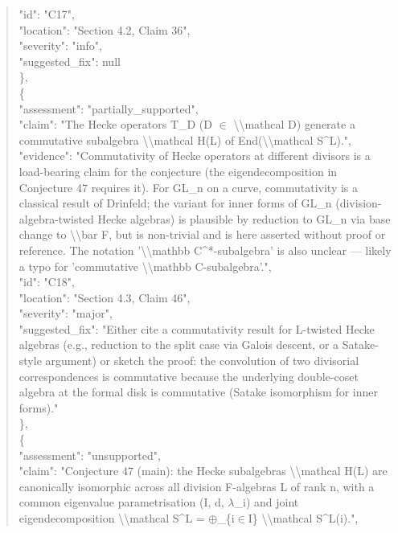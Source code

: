 \documentclass[11pt]{article}
\begin{document}
\begin{quote}
      "id": "C17",\\
      "location": "Section 4.2, Claim 36",\\
      "severity": "info",\\
      "suggested\_fix": null\\
    \},\\
    \{\\
      "assessment": "partially\_supported",\\
      "claim": "The Hecke operators T\_D (D \ensuremath{\in} \textbackslash{}\textbackslash{}mathcal D) generate a commutative subalgebra \textbackslash{}\textbackslash{}mathcal H(L) of End(\textbackslash{}\textbackslash{}mathcal S\^{}L).",\\
      "evidence": "Commutativity of Hecke operators at different divisors is a load-bearing claim for the conjecture (the eigendecomposition in Conjecture 47 requires it). For GL\_n on a curve, commutativity is a classical result of Drinfeld; the variant for inner forms of GL\_n (division-algebra-twisted Hecke algebras) is plausible by reduction to GL\_n via base change to \textbackslash{}\textbackslash{}bar F, but is non-trivial and is here asserted without proof or reference. The notation '\textbackslash{}\textbackslash{}mathbb C\^{}*-subalgebra' is also unclear --- likely a typo for 'commutative \textbackslash{}\textbackslash{}mathbb C-subalgebra'.",\\
      "id": "C18",\\
      "location": "Section 4.3, Claim 46",\\
      "severity": "major",\\
      "suggested\_fix": "Either cite a commutativity result for L-twisted Hecke algebras (e.g., reduction to the split case via Galois descent, or a Satake-style argument) or sketch the proof: the convolution of two divisorial correspondences is commutative because the underlying double-coset algebra at the formal disk is commutative (Satake isomorphism for inner forms)."\\
    \},\\
    \{\\
      "assessment": "unsupported",\\
      "claim": "Conjecture 47 (main): the Hecke subalgebras \textbackslash{}\textbackslash{}mathcal H(L) are canonically isomorphic across all division F-algebras L of rank n, with a common eigenvalue parametrisation (I, d, \ensuremath{\lambda}\_i) and joint eigendecomposition \textbackslash{}\textbackslash{}mathcal S\^{}L = \ensuremath{\oplus}\_\{i\ensuremath{\in}I\} \textbackslash{}\textbackslash{}mathcal S\^{}L(i).",\\

\end{quote}
\end{document}
